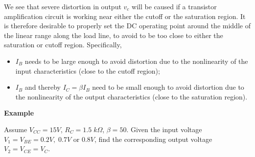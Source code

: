 \documentclass{article}
\begin{document}


We see that severe distortion in output $v_c$ will be caused if a transistor 
amplification circuit is working near either the cutoff or the saturation 
region. It is therefore desirable to properly set the DC operating point 
around the middle of the linear range along the load line, to avoid to be
too close to either the saturation or cutoff region. Specifically, 
\begin{itemize}
\item $I_B$ needs to be large enough to avoid distortion due to the
  nonlinearity of the input characteristics (close to the cutoff region);
\item $I_B$ and thereby $I_C=\beta I_B$ need to be small enough to avoid 
  distortion due to the nonlinearity of the output characteristics (close 
  to the saturation region).
\end{itemize}



{\bf Example}


Assume $V_{CC}=15V$, $R_C=1.5\;k\Omega$, $\beta=50$. Given the input voltage 
$V_1=V_{BE}=0.2V,\;0.7V$ or $0.8V$, find the corresponding output voltage 
$V_2=V_{CE}=V_C$.
\end{document}
